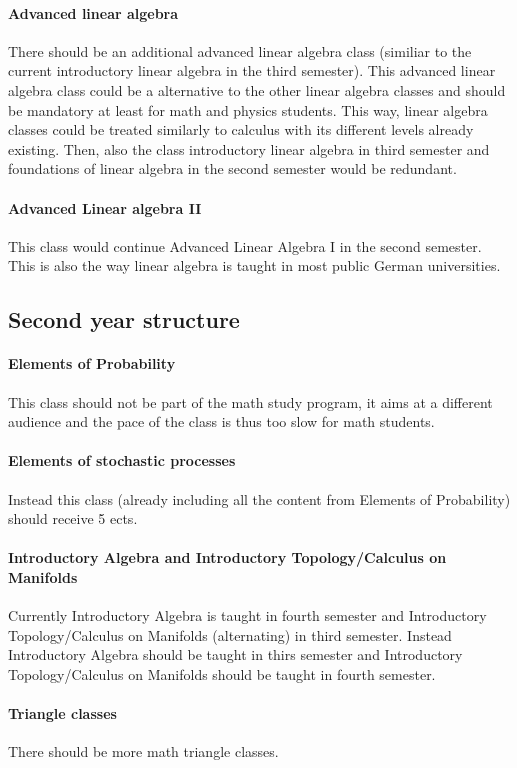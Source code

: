\paragraph{Advanced linear algebra} There should be an additional advanced linear algebra class (similiar to the current introductory linear algebra in the third semester). 
This advanced linear algebra class could be a alternative to the other linear algebra classes and should be mandatory at least for math and physics students. 
This way, linear algebra classes could be treated similarly to calculus with its different levels already existing.
Then, also the class introductory linear algebra in third semester and foundations of linear algebra in the second semester would be redundant.
\paragraph{Advanced Linear algebra II} This class would continue Advanced Linear Algebra I in the second semester. 
This is also the way linear algebra is taught in most public German universities.
\subsection{Second year structure}
\label{sec-3-2}
\paragraph{Elements of Probability} This class should not be part of the math study program, it aims at a different audience and the pace of the class is thus too slow for math students. 
\paragraph{Elements of stochastic processes} Instead this class (already including all the content from Elements of Probability) should receive 5 ects.
\paragraph{Introductory Algebra and Introductory Topology/Calculus on Manifolds} Currently Introductory Algebra is taught in fourth semester and Introductory Topology/Calculus on Manifolds (alternating) in third semester. 
Instead Introductory Algebra should be taught in thirs semester and Introductory Topology/Calculus on Manifolds should be taught in fourth semester. 
\paragraph{Triangle classes} There should be more math triangle classes.
